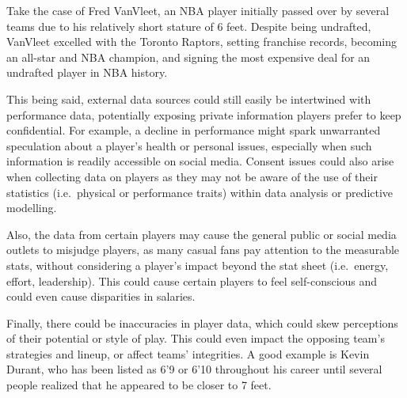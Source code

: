 \documentclass[
]{article}
\begin{document}
Take the case of Fred VanVleet, an NBA player initially passed over by
several teams due to his relatively short stature of 6 feet. Despite
being undrafted, VanVleet excelled with the Toronto Raptors, setting
franchise records, becoming an all-star and NBA champion, and signing
the most expensive deal for an undrafted player in NBA history.

This being said, external data sources could still easily be intertwined
with performance data, potentially exposing private information players
prefer to keep confidential. For example, a decline in performance might
spark unwarranted speculation about a player's health or personal
issues, especially when such information is readily accessible on social
media. Consent issues could also arise when collecting data on players
as they may not be aware of the use of their statistics (i.e.~physical
or performance traits) within data analysis or predictive modelling.

Also, the data from certain players may cause the general public or
social media outlets to misjudge players, as many casual fans pay
attention to the measurable stats, without considering a player's impact
beyond the stat sheet (i.e.~energy, effort, leadership). This could
cause certain players to feel self-conscious and could even cause
disparities in salaries.

Finally, there could be inaccuracies in player data, which could skew
perceptions of their potential or style of play. This could even impact
the opposing team's strategies and lineup, or affect teams' integrities.
A good example is Kevin Durant, who has been listed as 6'9 or 6'10
throughout his career until several people realized that he appeared to
be closer to 7 feet.
\end{document}
